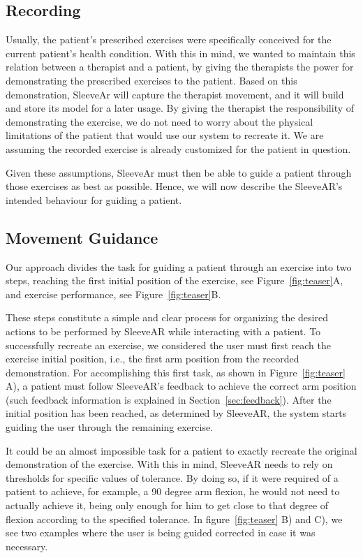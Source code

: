 \subsection{Recording}

Usually, the patient's prescribed exercises were specifically conceived for the current patient's health condition. 
With this in mind, we wanted to maintain this relation between a therapist and a patient, by giving the therapists the power for demonstrating the prescribed exercises to the patient. 
Based on this demonstration, SleeveAr will capture the therapist movement, and it will build and store its model for a later usage.
By giving the therapist the responsibility of demonstrating the exercise, we do not need to worry about the physical limitations of the patient that would use our system to recreate it. 
We are assuming the recorded exercise is already customized for the patient in question.

Given these assumptions, SleeveAr must then be able to guide a patient through those exercises as best as possible. Hence, we will now describe the SleeveAR's intended behaviour for guiding a patient.


\subsection{Movement Guidance}
Our approach divides the task for guiding a patient through
an exercise into two steps, reaching the first
initial position of  the  exercise, see  Figure~\ref{fig:teaser}A,  and exercise performance, see  Figure~\ref{fig:teaser}B. 

These steps constitute a simple and clear process for organizing the desired actions to be performed by SleeveAR while interacting with a patient.
To successfully recreate an exercise, we considered the user must first reach the exercise initial position, i.e., the first arm position from the recorded demonstration.
For accomplishing this first task, as shown in Figure~\ref{fig:teaser} A), a patient must follow SleeveAR's feedback to achieve the correct arm position (such feedback information is explained in Section~\ref{sec:feedback}).
After the initial position has been reached, as determined by SleeveAR, the system starts guiding the user through the remaining exercise.

It could be an almost impossible task for a patient to exactly recreate the original demonstration of the exercise. 
With this in mind, SleeveAR needs to rely on thresholds for specific values of tolerance. 
By doing so, if it were required of a patient to achieve, for example, a 90 degree arm flexion, he would not 
need to actually achieve it, being only enough for him to get close to that degree of flexion according to the specified tolerance.
In figure~\ref{fig:teaser} B) and C), we see two examples where the user is being guided corrected in case it was necessary.


